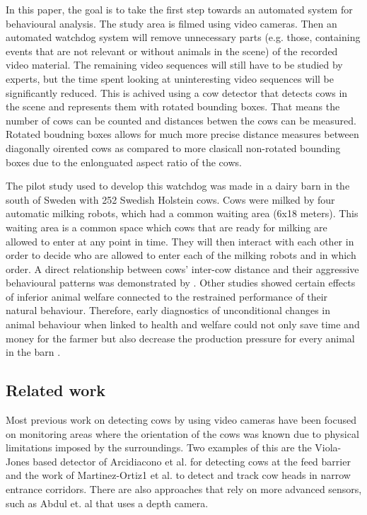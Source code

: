 \documentclass{IET}
\begin{document}
In this paper, the goal is to take the first step towards an automated system for behavioural analysis. The study area is filmed using video cameras. Then an automated watchdog system will remove unnecessary parts (e.g. those, containing events that are not relevant or without animals in the scene) of the recorded video material. The remaining video sequences will still have to be studied by experts, but the time spent looking at uninteresting video sequences will be significantly reduced. This is achived using a cow detector that detects cows in the scene and represents them with rotated bounding boxes. That means the number of cows can be counted and distances betwen the cows can be measured. Rotated boudning boxes allows for much more precise distance measures between diagonally oirented cows as compared to more clasicall non-rotated bounding boxes due to the enlonguated aspect ratio of the cows.

The pilot study used to develop this watchdog was made in a dairy barn in the south of Sweden with 252 Swedish Holstein cows. Cows were milked by four automatic milking robots, which had a common waiting area (6x18 meters). This waiting area is a common space which cows that are ready for milking are allowed to enter at any point in time. They will then interact with each other in order to decide who are allowed to enter each of the milking robots and in which order. A direct relationship between cows' inter-cow distance and their aggressive behavioural patterns was demonstrated by \cite{DeVriesetal2004}. Other studies \cite{Hemsworth2003, Kilgour2012} showed certain effects of inferior animal welfare connected to the restrained performance of their natural behaviour. Therefore, early diagnostics of unconditional changes in animal behaviour when linked to health and welfare could not only save time and money for the farmer but also decrease the production pressure for every animal in the barn \cite{Polikarpusetal2015}.

\subsection{Related work}
Most previous work on detecting cows by using video cameras have been focused on monitoring areas where the orientation of the cows was known due to physical limitations imposed by the surroundings. Two examples of this are the Viola-Jones based detector of Arcidiacono et al. \cite{Arcidiacono2012} for detecting cows at the feed barrier and the work of Martinez-Ortiz1 et al. \cite{martinez2013video} to detect and track cow heads in narrow entrance corridors. There are also approaches that rely on more advanced sensors, such as Abdul et. al  that uses a depth camera.
\end{document}
